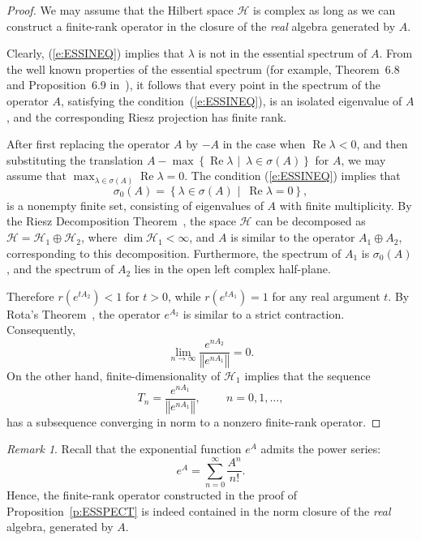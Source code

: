 \documentclass{tran-l}
\theoremstyle{definition}
\theoremstyle{remark}
\newtheorem{rem}[thm]{Remark}
\numberwithin{equation}{subsection}
\DeclareMathOperator{\RE}{Re}
\newcommand{\To}{\longrightarrow}
\newcommand{\h}{\mathcal{H}}
\newcommand{\set}[1]{\left\{#1\right\}}
\newcommand{\norm}[1]{\left\Vert#1\right\Vert}
\begin{document}
\begin{proof}
We may assume that the Hilbert space $\h$ is complex as long as we can construct a finite-rank operator in the closure of the \emph{real} algebra generated by $A$.

Clearly, (\ref{e:ESSINEQ}) implies that $\lambda$ is not in the essential spectrum of $A$. From the well known properties of the essential spectrum (for example, Theorem~6.8 and Proposition~6.9 in~\cite[p.~366]{Con90}), it follows that every point in the spectrum of the operator $A$, satisfying the condition~(\ref{e:ESSINEQ}), is an isolated eigenvalue of $A$, and the corresponding Riesz projection has finite rank.

After first replacing the operator $A$ by $-A$ in the case when $\RE\lambda<0$, and then substituting the translation $A-\max\set{\RE\lambda\,\,|\,\,\,\lambda\in\sigma(A)}$ for $A$, we may assume that $\max_{\lambda\in\sigma(A)}{\RE\lambda}=0$. The condition (\ref{e:ESSINEQ}) implies that
\[ \sigma_0(A)=\set{\lambda\in\sigma(A)\,\,|\,\,\,\RE\lambda=0}, \]
is a nonempty finite set, consisting of eigenvalues of $A$ with finite multiplicity. By the Riesz Decomposition Theorem~\cite[p.~31]{RR73}, the space $\h$ can be decomposed as $\h=\h_1\oplus\h_2$, where $\dim{\h_1}<\infty$, and $A$ is similar to the operator $A_1\oplus{A_2}$, corresponding to this decomposition. Furthermore, the spectrum of $A_1$ is $\sigma_0(A)$, and the spectrum of $A_2$ lies in the open left complex half-plane.

Therefore $r(e^{t{A_2}})<1$ for $t>0$, while $r(e^{t{A_1}})=1$ for any real argument $t$. By Rota's Theorem~\cite[p.~136]{Pau86}, the operator $e^{A_2}$ is similar to a strict contraction. Consequently,
\[ \lim_{n\To\infty}\frac{ e^{n{A_2}} }{ \norm{e^{n{A_1}}} }=0. \]
On the other hand, finite-dimensionality of $\h_1$ implies that the sequence
\[ T_n = \frac{e^{n{A_1}}}{\norm{e^{n{A_1}}}}, ~
  \qquad n=0,1,\ldots, \]
has a subsequence converging in norm to a nonzero finite-rank operator.
\end{proof}

\begin{rem}
Recall that the exponential function $e^A$ admits the power series:
\[ e^A = \sum_{n=0}^{\infty} \frac{A^n}{n!}. \]
Hence, the finite-rank operator constructed in the proof of Proposition~\ref{p:ESSPECT} is indeed contained in the norm closure of the \emph{real} algebra, generated by $A$.
\end{rem}

\end{document}
